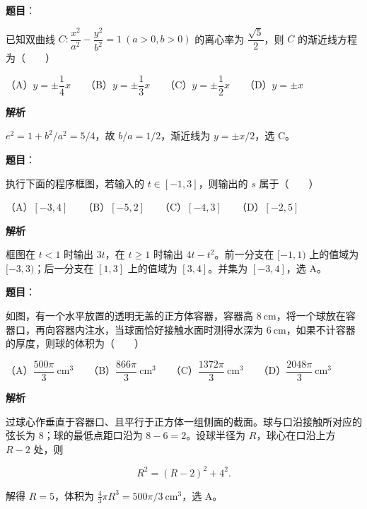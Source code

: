 \begin{answer}

\textbf{题目}：

已知双曲线 $C:\dfrac{x^2}{a^2}-\dfrac{y^2}{b^2}=1\ (a>0,b>0)$ 的离心率为 $\dfrac{\sqrt5}{2}$，则 $C$ 的渐近线方程为\mbox{（　　）}

（A）$y=\pm\dfrac14x$　　（B）$y=\pm\dfrac13x$　　（C）$y=\pm\dfrac12x$　　（D）$y=\pm x$

\textbf{解析}

$e^2=1+b^2/a^2=5/4$，故 $b/a=1/2$，渐近线为 $y=\pm x/2$，选 C。


\end{answer}
\begin{answer}

\textbf{题目}：

执行下面的程序框图，若输入的 $t\in[-1,3]$，则输出的 $s$ 属于\mbox{（　　）}
\nopagebreak[4]
\begin{center}\end{center}
\nopagebreak[4]
（A）$[-3,4]$　　（B）$[-5,2]$　　（C）$[-4,3]$　　（D）$[-2,5]$

\textbf{解析}

框图在 $t<1$ 时输出 $3t$，在 $t\geqslant1$ 时输出 $4t-t^2$。前一分支在 $[-1,1)$ 上的值域为 $[-3,3)$；后一分支在 $[1,3]$ 上的值域为 $[3,4]$。并集为 $[-3,4]$，选 A。


\end{answer}
\begin{answer}

\textbf{题目}：

如图，有一个水平放置的透明无盖的正方体容器，容器高 $8\ \mathrm{cm}$，将一个球放在容器口，再向容器内注水，当球面恰好接触水面时测得水深为 $6\ \mathrm{cm}$，如果不计容器的厚度，则球的体积为\mbox{（　　）}
\nopagebreak[4]
\begin{center}\end{center}
\nopagebreak[4]
（A）$\dfrac{500\pi}{3}\ \mathrm{cm}^3$　　（B）$\dfrac{866\pi}{3}\ \mathrm{cm}^3$　　（C）$\dfrac{1372\pi}{3}\ \mathrm{cm}^3$　　（D）$\dfrac{2048\pi}{3}\ \mathrm{cm}^3$

\textbf{解析}

过球心作垂直于容器口、且平行于正方体一组侧面的截面。球与口沿接触所对应的弦长为 $8$；球的最低点距口沿为 $8-6=2$。设球半径为 $R$，球心在口沿上方 $R-2$ 处，则

\nopagebreak[4]
\[
R^2=(R-2)^2+4^2.
\]

解得 $R=5$，体积为 $\tfrac43\pi R^3=500\pi/3\ \mathrm{cm}^3$，选 A。


\end{answer}
